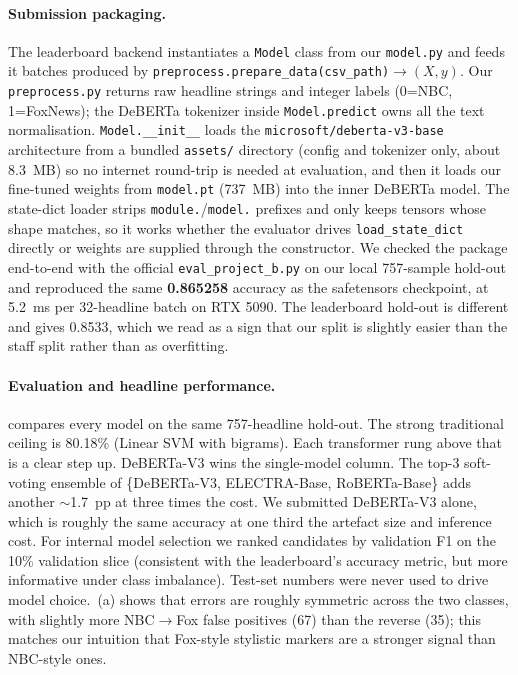 \documentclass[10pt]{article}
\begin{document}
\paragraph{Submission packaging.} The leaderboard backend instantiates a \texttt{Model} class from our \texttt{model.py} and feeds it batches produced by \texttt{preprocess.prepare\_data(csv\_path)$\to(X,y)$}. Our \texttt{preprocess.py} returns raw headline strings and integer labels (0=NBC, 1=FoxNews); the DeBERTa tokenizer inside \texttt{Model.predict} owns all the text normalisation. \texttt{Model.\_\_init\_\_} loads the \texttt{microsoft/deberta-v3-base} architecture from a bundled \texttt{assets/} directory (config and tokenizer only, about 8.3~MB) so no internet round-trip is needed at evaluation, and then it loads our fine-tuned weights from \texttt{model.pt} (737~MB) into the inner DeBERTa model. The state-dict loader strips \texttt{module.}/\texttt{model.} prefixes and only keeps tensors whose shape matches, so it works whether the evaluator drives \texttt{load\_state\_dict} directly or weights are supplied through the constructor. We checked the package end-to-end with the official \texttt{eval\_project\_b.py} on our local 757-sample hold-out and reproduced the same \textbf{0.865258} accuracy as the safetensors checkpoint, at 5.2~ms per 32-headline batch on RTX 5090. The leaderboard hold-out is different and gives 0.8533, which we read as a sign that our split is slightly easier than the staff split rather than as overfitting.

\paragraph{Evaluation and headline performance.}  compares every model on the same 757-headline hold-out. The strong traditional ceiling is 80.18\% (Linear SVM with bigrams). Each transformer rung above that is a clear step up. DeBERTa-V3 wins the single-model column. The top-3 soft-voting ensemble of \{DeBERTa-V3, ELECTRA-Base, RoBERTa-Base\} adds another $\sim$1.7~pp at three times the cost. We submitted DeBERTa-V3 alone, which is roughly the same accuracy at one third the artefact size and inference cost. For internal model selection we ranked candidates by validation F1 on the 10\% validation slice (consistent with the leaderboard's accuracy metric, but more informative under class imbalance). Test-set numbers were never used to drive model choice. \,(a) shows that errors are roughly symmetric across the two classes, with slightly more NBC$\to$Fox false positives (67) than the reverse (35); this matches our intuition that Fox-style stylistic markers are a stronger signal than NBC-style ones.
\end{document}
